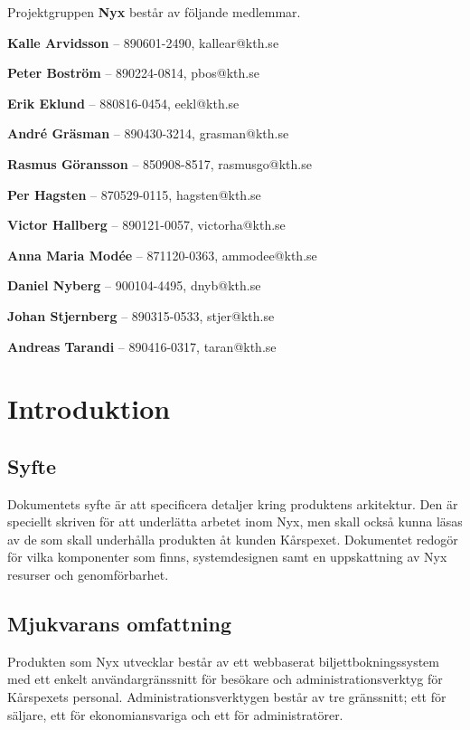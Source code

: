 \documentclass[a4paper, twoside, 11pt, titlepage]{article}
\begin{document}
Projektgruppen \textbf{Nyx} består av följande medlemmar.

\textbf{Kalle Arvidsson} -- 890601-2490, kallear@kth.se

\textbf{Peter Boström} -- 890224-0814, pbos@kth.se

\textbf{Erik Eklund} -- 880816-0454, eekl@kth.se

\textbf{André Gräsman} -- 890430-3214, grasman@kth.se

\textbf{Rasmus Göransson} -- 850908-8517, rasmusgo@kth.se

\textbf{Per Hagsten} -- 870529-0115, hagsten@kth.se

\textbf{Victor Hallberg} -- 890121-0057, victorha@kth.se

\textbf{Anna Maria Modée} -- 871120-0363, ammodee@kth.se

\textbf{Daniel Nyberg} -- 900104-4495, dnyb@kth.se

\textbf{Johan Stjernberg} -- 890315-0533, stjer@kth.se

\textbf{Andreas Tarandi} -- 890416-0317, taran@kth.se

\clearpage \tableofcontents \clearpage

\clearpage
\section{Introduktion}



	\subsection{Syfte}


	Dokumentets syfte är att specificera detaljer kring produktens arkitektur. Den är speciellt skriven för att underlätta arbetet inom Nyx, men skall också kunna läsas av de som skall underhålla produkten åt kunden Kårspexet. Dokumentet redogör för vilka komponenter som finns, systemdesignen samt en uppskattning av Nyx resurser och genomförbarhet.

	\subsection{Mjukvarans omfattning}


	Produkten som Nyx utvecklar består av ett webbaserat biljettbokningssystem med ett enkelt användargränssnitt för besökare och administrationsverktyg för Kårspexets personal. Administrationsverktygen består av tre gränssnitt; ett för säljare, ett för ekonomiansvariga och ett för administratörer.
\end{document}
